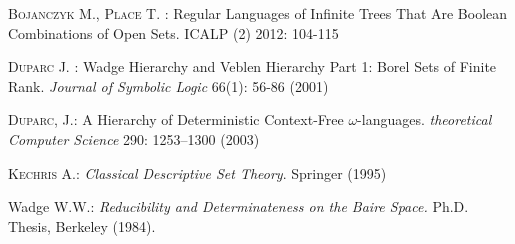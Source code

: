 \documentclass{llncs}
\begin{document}



\begin{thebibliography}{00}


\textsc{Bojanczyk} M., \textsc{Place} T. :  Regular Languages of Infinite Trees That Are Boolean Combinations of Open Sets. ICALP (2) 2012: 104-115



\textsc{Duparc} J. : Wadge Hierarchy and Veblen Hierarchy Part 1: Borel Sets of Finite Rank. \textit{Journal of Symbolic Logic} 66(1): 56-86 (2001)


\textsc{Duparc}, J.: 
A Hierarchy of Deterministic Context-Free $\omega$-languages.
\textit{theoretical Computer Science} 290: 1253--1300 (2003)





\textsc{Kechris} A.: \emph{Classical Descriptive Set Theory}. Springer (1995)


{\sc Wadge} W.W.: {\em Reducibility and Determinateness on the Baire Space.}  Ph.D. Thesis, Berkeley (1984).



\end{thebibliography}
\end{document}
